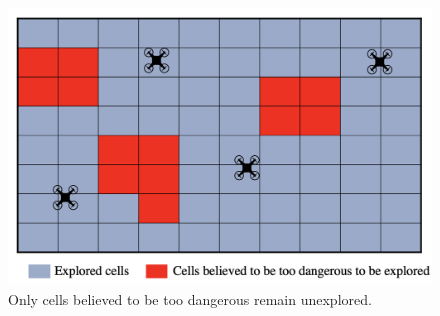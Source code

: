 \begin{figure}
     \includegraphics[width=16cm]{figures/dora_explorer/risk_aware_d.png}
     \caption[Risk-awareness intuition (4)]{Only cells believed to be too dangerous remain unexplored.}
     \label{risk_aware_d}
\end{figure}


